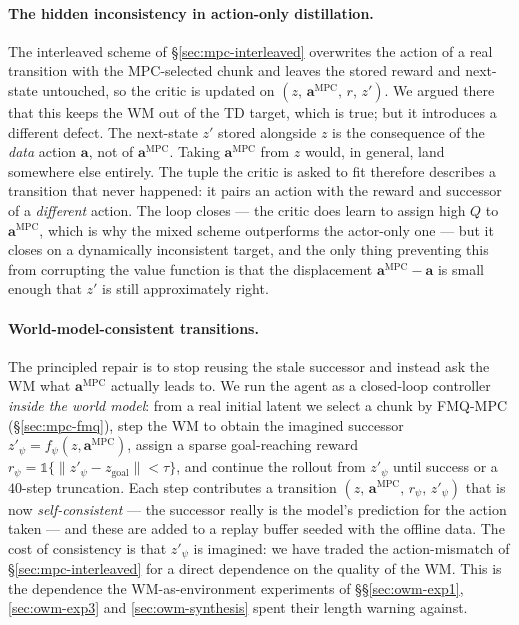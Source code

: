 \paragraph{The hidden inconsistency in action-only distillation.}
The interleaved scheme of \S\ref{sec:mpc-interleaved} overwrites the
action of a real transition with the MPC-selected chunk and leaves the
stored reward and next-state untouched, so the critic is updated on
$(z,\, \mathbf{a}^{\text{MPC}},\, r,\, z')$. We argued there that this
keeps the WM out of the TD target, which is true; but it introduces a
different defect. The next-state $z'$ stored alongside $z$ is the
consequence of the \emph{data} action $\mathbf{a}$, not of
$\mathbf{a}^{\text{MPC}}$. Taking $\mathbf{a}^{\text{MPC}}$ from $z$
would, in general, land somewhere else entirely. The tuple the critic is
asked to fit therefore describes a transition that never happened: it
pairs an action with the reward and successor of a \emph{different}
action. The loop closes --- the critic does learn to assign high $Q$ to
$\mathbf{a}^{\text{MPC}}$, which is why the mixed scheme outperforms the
actor-only one --- but it closes on a dynamically inconsistent target,
and the only thing preventing this from corrupting the value function is
that the displacement $\mathbf{a}^{\text{MPC}} - \mathbf{a}$ is small
enough that $z'$ is still approximately right.

\paragraph{World-model-consistent transitions.}
The principled repair is to stop reusing the stale successor and instead
ask the WM what $\mathbf{a}^{\text{MPC}}$ actually leads to. We run the
agent as a closed-loop controller \emph{inside the world model}: from a
real initial latent we select a chunk by FMQ-MPC (\S\ref{sec:mpc-fmq}),
step the WM to obtain the imagined successor
$z'_\psi = f_\psi(z, \mathbf{a}^{\text{MPC}})$, assign a sparse
goal-reaching reward
$r_\psi = \mathbb{1}\{\lVert z'_\psi - z_{\text{goal}}\rVert < \tau\}$,
and continue the rollout from $z'_\psi$ until success or a $40$-step
truncation. Each step contributes a transition
$(z,\, \mathbf{a}^{\text{MPC}},\, r_\psi,\, z'_\psi)$ that is now
\emph{self-consistent} --- the successor really is the model's
prediction for the action taken --- and these are added to a replay
buffer seeded with the offline data. The cost of consistency is that
$z'_\psi$ is imagined: we have traded the action-mismatch of
\S\ref{sec:mpc-interleaved} for a direct dependence on the quality of
the WM. This is the dependence the WM-as-environment experiments of
\S\S\ref{sec:owm-exp1}, \ref{sec:owm-exp3} and \ref{sec:owm-synthesis}
spent their length warning against.

